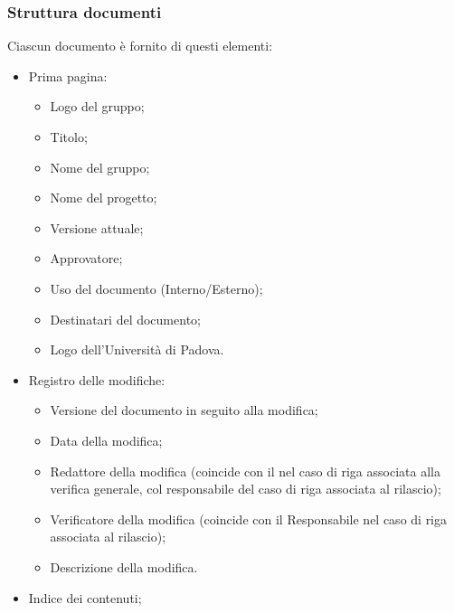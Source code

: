 \subsubsection{Struttura documenti}
Ciascun documento è fornito di questi elementi:
\begin{itemize}
  \item Prima pagina:
  \begin{itemize}
    \item Logo del gruppo;
    \item Titolo;
    \item Nome del gruppo;
    \item Nome del progetto;
    \item Versione attuale;
    \item Approvatore;
    \item Uso del documento (Interno/Esterno);
    \item Destinatari del documento;
    \item Logo dell'Università di Padova.
  \end{itemize}
  \item Registro delle modifiche:
  \begin{itemize}
    \item Versione del documento in seguito alla modifica;
    \item Data della modifica;
    \item Redattore della modifica (coincide con il \Verificatore nel caso di riga associata alla verifica generale, col responsabile del caso di riga associata al rilascio);
    \item Verificatore della modifica (coincide con il Responsabile nel caso di riga associata al rilascio);
    \item Descrizione della modifica.
  \end{itemize}
  \item Indice dei contenuti;
\end{itemize}

